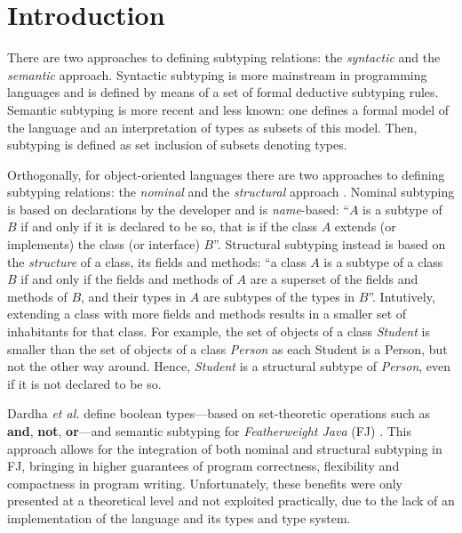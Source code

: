 \documentclass[runningheads]{llncs}
\begin{document}
\section{Introduction}
\label{sec:intro}
There are two approaches to defining subtyping relations: the \emph{syntactic} and the \emph{semantic} approach.
Syntactic subtyping \cite{Liskov1994} is more mainstream in programming languages and is defined by means of a set of formal deductive subtyping rules.
Semantic subtyping \cite{Castagna2005,Cas05,Frisch2008} is more recent and less known:  one defines a formal model of the language and an interpretation of types as subsets of this model. Then, subtyping is defined as set inclusion of subsets denoting types.

Orthogonally, for object-oriented languages there are two approaches to defining subtyping relations: the \emph{nominal} and the \emph{structural} approach \cite{Integrating,Useful}.
Nominal subtyping is based on {declarations} by the developer and is \emph{name}-based: ``$A$ is a subtype of $B$ if and only if it is declared to be so, that is if the class $A$ extends (or implements) the class (or interface) $B$''.
Structural subtyping instead is based on the \emph{structure} of a class, its fields and methods: ``a class $A$ is a subtype of a class $B$ if and only if the fields and methods of $A$ are a superset of the fields and methods of $B$, and their types in $A$ are subtypes of the types in $B$''.
Intutively, extending a class with more fields and methods results in a smaller set of inhabitants for that class. For example, the set of objects of a class \emph{Student} is smaller than the set of objects of a class \emph{Person} as each Student is a Person, but not the other way around. Hence, \emph{Student} is a structural subtype of \emph{Person}, even if it is not declared to be so.


Dardha \emph{et al.} \cite{Dardha2013,Dardha2017} define boolean types---based on set-theoretic operations such as \textbf{and}, \textbf{not}, \textbf{or}---and semantic subtyping for \emph{Featherweight Java} (FJ) \cite{featherweight}.
This approach allows for the integration of both nominal and structural subtyping in FJ, bringing in higher guarantees of program correctness, flexibility and compactness in program writing.
Unfortunately, these benefits were only presented at a theoretical level and not exploited practically, due to the lack of an implementation of the language and its types and type system.
\end{document}

